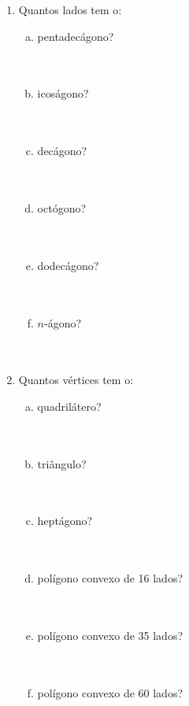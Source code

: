 \documentclass[a4paper,14pt]{article}
\begin{document}
\begin{multicols}{2}
\begin{enumerate}
			\item Quantos lados tem o:
			\begin{enumerate}[a)]
				\item pentadecágono? \\\\\\
				\item icoságono? \\\\\\
				\item decágono? \\\\\\
				\item octógono? \\\\\\
				\item dodecágono? \\\\\\
				\item $n$-ágono? \\\\\\
			\end{enumerate}
			\item Quantos vértices tem o:
			\begin{enumerate}[a)]
				\item quadrilátero? \\\\\\
				\item triângulo? \\\\\\
				\item heptágono? \\\\\\
				\item polígono convexo de 16 lados? \\\\\\
				\item polígono convexo de 35 lados? \\\\\\
				\item polígono convexo de 60 lados? \\\\\\

\end{enumerate}
\end{enumerate}
\end{multicols}
\end{document}
